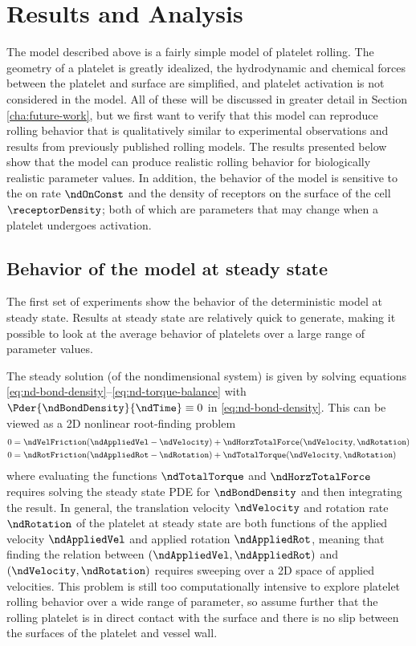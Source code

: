 \section{Results and Analysis}
\label{sec:results}

The model described above is a fairly simple model of platelet
rolling. The geometry of a platelet is greatly idealized, the
hydrodynamic and chemical forces between the platelet and surface are
simplified, and platelet activation is not considered in the
model. All of these will be discussed in greater detail in Section
\ref{cha:future-work}, but we first want to verify that this model can
reproduce rolling behavior that is qualitatively similar to
experimental observations and results from previously published
rolling models. The results presented below show that the model can
produce realistic rolling behavior for biologically realistic
parameter values. In addition, the behavior of the model is sensitive
to the on rate $\ndOnConst$ and the density of receptors on the
surface of the cell $\receptorDensity$; both of which are parameters
that may change when a platelet undergoes activation.

\subsection{Behavior of the model at steady state}
\label{sec:behav-model-steady}

The first set of experiments show the behavior of the deterministic
model at steady state. Results at steady state are relatively quick to
generate, making it possible to look at the average behavior of
platelets over a large range of parameter values. 

The steady solution (of the nondimensional system) is given by solving
equations \eqref{eq:nd-bond-density}--\eqref{eq:nd-torque-balance}
with $\Pder{\ndBondDensity}{\ndTime} \equiv 0$ in
\eqref{eq:nd-bond-density}. This can be viewed as a 2D nonlinear
root-finding problem
\begin{align}
  \label{eq:2D-ss-translation}
  0 &= \ndVelFriction (\ndAppliedVel - \ndVelocity) +
      \ndHorzTotalForce(\ndVelocity, \ndRotation) \\
  \label{eq:2D-ss-rotation}
  0 &= \ndRotFriction (\ndAppliedRot - \ndRotation) +
      \ndTotalTorque(\ndVelocity, \ndRotation)
\end{align}
where evaluating the functions $\ndTotalTorque$ and
$\ndHorzTotalForce$ requires solving the steady state PDE for
$\ndBondDensity$ and then integrating the result. In general, the
translation velocity $\ndVelocity$ and rotation rate $\ndRotation$ of
the platelet at steady state are both functions of the applied
velocity $\ndAppliedVel$ and applied rotation $\ndAppliedRot$, meaning
that finding the relation between $(\ndAppliedVel, \ndAppliedRot)$ and
$(\ndVelocity, \ndRotation)$ requires sweeping over a 2D space of
applied velocities. This problem is still too computationally
intensive to explore platelet rolling behavior over a wide range of
parameter, so assume further that the rolling platelet is in direct
contact with the surface and there is no slip between the surfaces of
the platelet and vessel wall.


